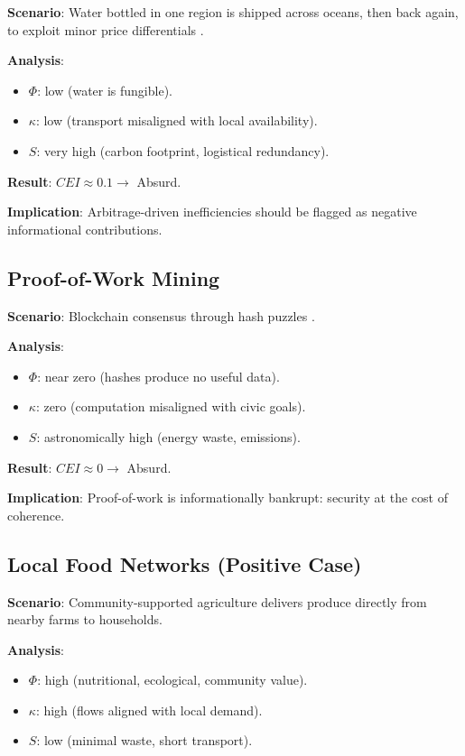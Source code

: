 \documentclass[openany]{book}
\begin{document}
\textbf{Scenario}: Water bottled in one region is shipped across oceans, then back again, to exploit minor price differentials \cite{water2025}.

\textbf{Analysis}:

\begin{itemize}
    \item $\Phi$: low (water is fungible).
    \item $\kappa$: low (transport misaligned with local availability).
    \item $S$: very high (carbon footprint, logistical redundancy).
\end{itemize}

\textbf{Result}: $CEI \approx 0.1 \rightarrow$ Absurd.

\textbf{Implication}: Arbitrage-driven inefficiencies should be flagged as negative informational contributions.

\subsection{Proof-of-Work Mining}

\textbf{Scenario}: Blockchain consensus through hash puzzles \cite{nakamoto2008}.

\textbf{Analysis}:

\begin{itemize}
    \item $\Phi$: near zero (hashes produce no useful data).
    \item $\kappa$: zero (computation misaligned with civic goals).
    \item $S$: astronomically high (energy waste, emissions).
\end{itemize}

\textbf{Result}: $CEI \approx 0 \rightarrow$ Absurd.

\textbf{Implication}: Proof-of-work is informationally bankrupt: security at the cost of coherence.

\subsection{Local Food Networks (Positive Case)}

\textbf{Scenario}: Community-supported agriculture delivers produce directly from nearby farms to households.

\textbf{Analysis}:

\begin{itemize}
    \item $\Phi$: high (nutritional, ecological, community value).
    \item $\kappa$: high (flows aligned with local demand).
    \item $S$: low (minimal waste, short transport).
\end{itemize}
\end{document}
